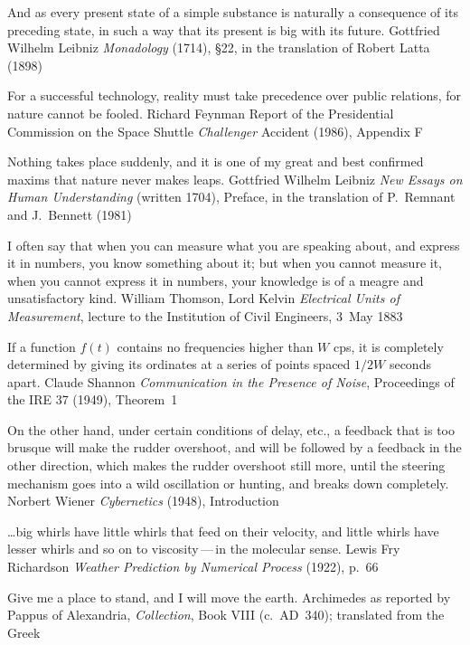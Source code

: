   {And as every present state of a simple substance is naturally a consequence of its preceding
   state, in such a way that its present is big with its future.}
  {Gottfried Wilhelm Leibniz}
  {\emph{Monadology} (1714), §22, in the translation of Robert Latta (1898)}

  {For a successful technology, reality must take precedence over public relations, for nature
   cannot be fooled.}
  {Richard Feynman}
  {Report of the Presidential Commission on the Space Shuttle \emph{Challenger} Accident (1986),
   Appendix F}

  {Nothing takes place suddenly, and it is one of my great and best confirmed maxims that nature
   never makes leaps.}
  {Gottfried Wilhelm Leibniz}
  {\emph{New Essays on Human Understanding} (written 1704), Preface, in the translation of
   P.~Remnant and J.~Bennett (1981)}

  {I often say that when you can measure what you are speaking about, and express it in numbers,
   you know something about it; but when you cannot measure it, when you cannot express it in
   numbers, your knowledge is of a meagre and unsatisfactory kind.}
  {William Thomson, Lord Kelvin}
  {\emph{Electrical Units of Measurement}, lecture to the Institution of Civil Engineers, 3~May 1883}

  {If a function $f(t)$ contains no frequencies higher than $W$ cps, it is completely determined
   by giving its ordinates at a series of points spaced $1/2W$ seconds apart.}
  {Claude Shannon}
  {\emph{Communication in the Presence of Noise}, Proceedings of the IRE 37 (1949), Theorem~1}

  {On the other hand, under certain conditions of delay, etc., a feedback that is too brusque will
   make the rudder overshoot, and will be followed by a feedback in the other direction, which
   makes the rudder overshoot still more, until the steering mechanism goes into a wild
   oscillation or hunting, and breaks down completely.}
  {Norbert Wiener}
  {\emph{Cybernetics} (1948), Introduction}

  {\ldots big whirls have little whirls that feed on their velocity, and little whirls have lesser
   whirls and so on to viscosity\,---\,in the molecular sense.}
  {Lewis Fry Richardson}
  {\emph{Weather Prediction by Numerical Process} (1922), p.~66}

  {Give me a place to stand, and I will move the earth.}
  {Archimedes}
  {as reported by Pappus of Alexandria, \emph{Collection}, Book VIII (c.~AD~340); translated from
   the Greek}

